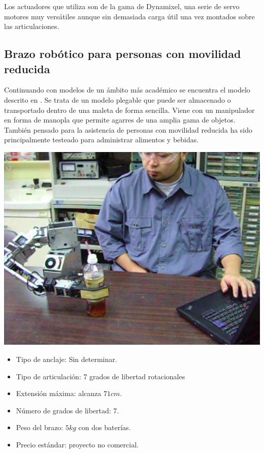      Los actuadores que utiliza son de la gama de Dynamixel, una serie de servo motores muy versátiles aunque sin demasiada carga útil una vez montados sobre las articulaciones.

 \subsection{Brazo robótico para personas con movilidad reducida}

    Continuando con modelos de un ámbito más académico se encuentra el modelo descrito en \cite{Hideyuki:2010}. Se trata de un modelo plegable que puede ser almacenado o transportado dentro de una maleta de forma sencilla. Viene con un manipulador en forma de manopla que permite agarres de una amplia gama de objetos. También pensado para la asistencia de personas con movilidad reducida ha sido principalmente testeado para administrar alimentos y bebidas.
    \\

     \begin{minipage}{0.35\textwidth}
       \includegraphics[width=\linewidth]{figuras/Imagenes_EstadoArte/Tokyo.png}
     \end{minipage}
     \begin{minipage}{0.65\textwidth}\raggedright
       \hspace{1cm}
       \begin{itemize}
           \item Tipo de anclaje: Sin determinar.
           \item Tipo de articulación: 7 grados de libertad rotacionales
   	  		\item Extensión máxima: alcanza $71cm$.
   	  		\item Número de grados de libertad: 7.
   	  		\item Peso del brazo: $5kg$ con dos baterías.
   	  		\item Precio estándar: proyecto no comercial.
       \end{itemize}
     \end{minipage}
     \\

